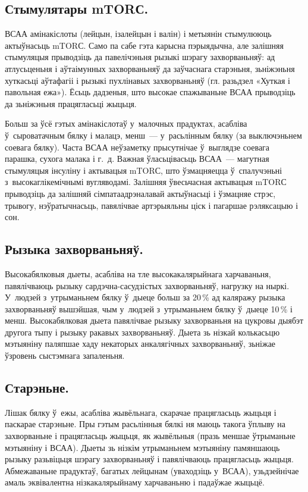 
\subsection{Стымулятары mTORС.}
ВСАА амінакіслоты (лейцын, ізалейцын і валін) і метыянін стымулююць актыўнасьць mTORС. Само па сабе гэта карысна пэрыядычна, але залішняя стымуляцыя прыводзіць да павелічэньня рызыкі шэрагу захворваньняў: ад атлусьценьня і аўтаімунных захворваньняў да заўчаснага старэньня, зьніжэньня хуткасьці аўтафагіі і рызыкі пухлінавых захворваньняў (гл. разьдзел «Хуткая і павольная ежа»). Ёсьць дадзеныя, што высокае спажываньне ВСАА прыводзіць да зьніжэньня працягласьці жыцьця.

Больш за ўсё гэтых амінакіслотаў у~малочных прадуктах, асабліва ў~сыроватачным бялку і малацэ, менш~--- у~расьлінным бялку (за выключэньнем соевага бялку). Часта ВСАА неўзаметку прысутнічае ў~выглядзе соевага парашка, сухога малака і г.~д. Важная ўласьцівасьць ВСАА~--- магутная стымуляцыя інсуліну і актывацыя mTORС, што ўзмацняецца ў~спалучэньні з~высокаглікемічнымі вугляводамі. Залішняя ўвесьчасная актывацыя mTORС прыводзіць да залішняй сімпатаадрэналавай актыўнасьці і ўзмацняе стрэс, трывогу, нэўратычнасьць, павялічвае артэрыяльны ціск і пагаршае рэляксацыю і сон.

\subsection{Рызыка захворваньняў.}
Высокабялковыя дыеты, асабліва на тле высокакалярыйнага харчаваньня, павялічваюць рызыку сардэчна-сасудзістых захворваньняў, нагрузку на ныркі. У~людзей з~утрыманьнем бялку ў~дыеце больш за 20\,\% ад каляражу рызыка захворваньняў вышэйшая, чым у~людзей з~утрыманьнем бялку ў~дыеце 10\,\% і менш. Высокабялковая дыета павялічвае рызыку захворваньня на цукровы дыябэт другога тыпу і рызыку ракавых захворваньняў. Дыета зь нізкай колькасьцю мэтыяніну паляпшае хаду некаторых анкалягічных захворваньняў, зьніжае ўзровень сыстэмнага запаленьня.

\subsection{Старэньне.}
Лішак бялку ў~ежы, асабліва жывёльнага, скарачае працягласьць жыцьця і паскарае старэньне. Пры гэтым расьлінныя бялкі ня маюць такога ўплыву на захворваньне і працягласьць жыцьця, як жывёльныя (празь меншае ўтрыманьне мэтыяніну і ВСАА). Дыеты зь нізкім утрыманьнем мэтыяніну памяншаюць рызыку разьвіцьця шэрагу захворваньняў і павялічваюць працягласьць жыцьця. Абмежаваньне прадуктаў, багатых лейцынам (уваходзіць у~ВСАА), узьдзейнічае амаль эквівалентна нізкакалярыйнаму харчаваньню і падаўжае жыцьцё.

